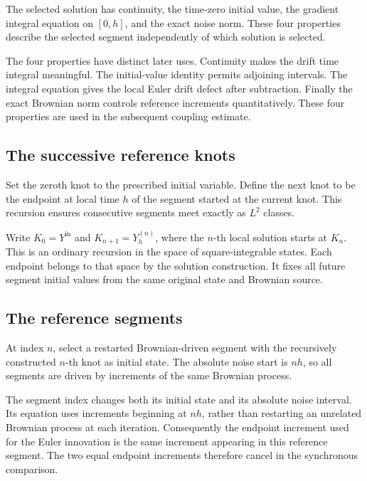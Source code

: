 \documentclass[11pt,a4paper]{article}
\begin{document}
The selected solution has continuity, the time-zero initial value, the gradient integral equation on \([0,h]\), and the exact noise norm. These four properties describe the selected segment independently of which solution is selected.



The four properties have distinct later uses. Continuity makes the drift time integral meaningful. The initial-value identity permits adjoining intervals. The integral equation gives the local Euler drift defect after subtraction. Finally the exact Brownian norm controls reference increments quantitatively. These four properties are used in the subsequent coupling estimate.


\subsection{\texorpdfstring{The successive reference knots}{The successive reference knots}}


Set the zeroth knot to the prescribed initial variable. Define the next knot to be the endpoint at local time \(h\) of the segment started at the current knot. This recursion ensures consecutive segments meet exactly as \(L^2\) classes.



Write \(K_0=Y^{\mathrm{in}}\) and \(K_{n+1}=Y^{(n)}_h\), where the \(n\)-th local solution starts at \(K_n\). This is an ordinary recursion in the space of square-integrable states. Each endpoint belongs to that space by the solution construction. It fixes all future segment initial values from the same original state and Brownian source.


\subsection{\texorpdfstring{The reference segments}{The reference segments}}


At index \(n\), select a restarted Brownian-driven segment with the recursively constructed \(n\)-th knot as initial state. The absolute noise start is \(nh\), so all segments are driven by increments of the same Brownian process.



The segment index changes both its initial state and its absolute noise interval. Its equation uses increments beginning at \(nh\), rather than restarting an unrelated Brownian process at each iteration. Consequently the endpoint increment used for the Euler innovation is the same increment appearing in this reference segment. The two equal endpoint increments therefore cancel in the synchronous comparison.
\end{document}
